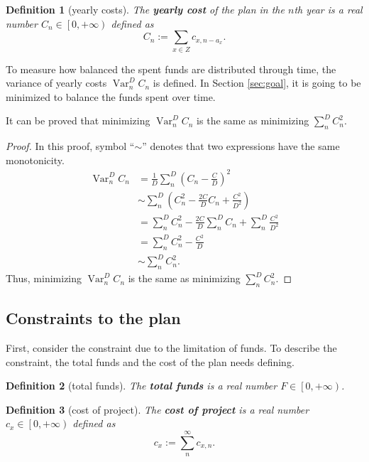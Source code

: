 \documentclass{article}
\DeclareMathOperator*{\var}{Var}
\newtheorem{definition}{Definition}
\begin{document}
\begin{definition}[yearly costs]
The \textbf{yearly cost} of the plan in the $n$th year is a real number $C_n\in\left[0,+\infty\right)$ defined as
\begin{equation}
\label{eq:yearly cost}
C_n:=\sum_{x\in Z}c_{x,n-a_x}.
\end{equation}
\end{definition}

To measure how balanced the spent funds are distributed through time, the variance of yearly costs $\var_n^DC_n$ is defined.
In Section \ref{sec:goal}, it is going to be minimized to balance the funds spent over time.

It can be proved that minimizing $\var_n^DC_n$ is the same as minimizing $\sum_n^DC_n^2$.

\begin{proof}
In this proof, symbol ``$\sim$'' denotes that two expressions have the same monotonicity.
\begin{align*}
\var_n^DC_n&=\frac1D\sum_n^D\left(C_n-\frac CD\right)^2\\
&\sim\sum_n^D\left(C_n^2-\frac{2C}DC_n+\frac{C^2}{D^2}\right)\\
&=\sum_n^DC_n^2-\frac{2C}D\sum_n^DC_n+\sum_n^D\frac{C^2}{D^2}\\
&=\sum_n^DC_n^2-\frac{C^2}D\\
&\sim\sum_n^DC_n^2.
\end{align*}
Thus, minimizing $\var_n^DC_n$ is the same as minimizing $\sum_n^DC_n^2$.
\end{proof}

\subsection{Constraints to the plan}
\label{sec:constraints}

First, consider the constraint due to the limitation of funds.
To describe the constraint, the total funds and the cost of the plan needs defining.

\begin{definition}[total funds]
The \textbf{total funds} is a real number $F\in\left[0,+\infty\right)$.
\end{definition}

\begin{definition}[cost of project]
The \textbf{cost of project} is a real number $c_x\in\left[0,+\infty\right)$ defined as
\begin{equation}
c_x:=\sum_n^\infty c_{x,n}.
\end{equation}
\end{definition}
\end{document}
